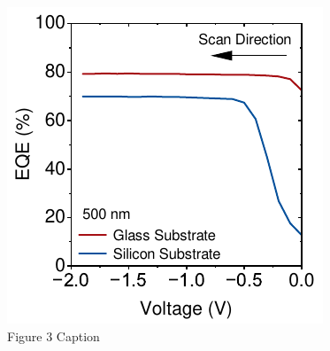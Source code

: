 \begin{figure}[h!]
    \vspace{1em} %
    \begin{minipage}{0.48\textwidth}
        \centering
        \includegraphics[width=\textwidth]{chapters/material_properties/images/EQE_fV_PIX_Glass.pdf} %
        \caption{Figure 3 Caption}
        \label{fig:figure3}
    \end{minipage}
\end{figure}


